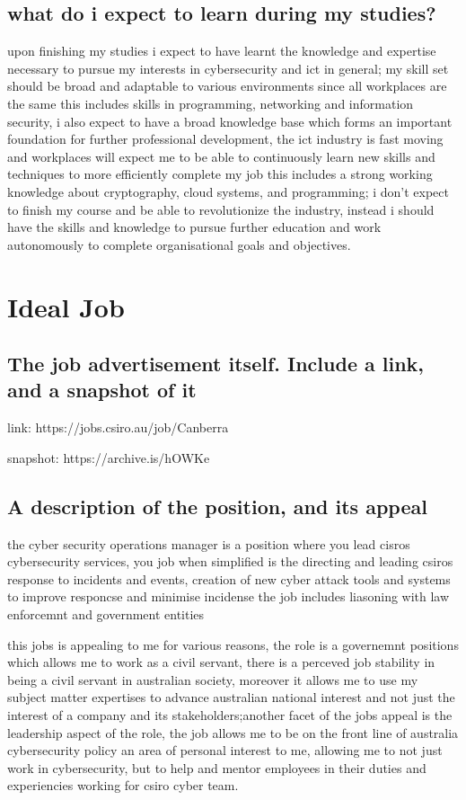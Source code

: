 \documentclass{article}
\begin{document}
\subsection{what do i expect to learn during my studies?}

upon finishing my studies i expect to have learnt the knowledge and expertise necessary to pursue my interests in cybersecurity and ict in general;
my skill set should be broad and adaptable to various environments since all workplaces are the same this includes skills in programming, networking and information security,
i also expect to have a broad knowledge base which forms an important foundation for further professional development, the ict industry is fast moving and workplaces will expect me to be able to
continuously learn new skills and techniques to more efficiently complete my job this includes a strong  working knowledge about cryptography, cloud systems, and programming; 
i don't expect to finish my course and be able to revolutionize the industry, instead i should have the skills and knowledge to pursue further education and work autonomously to complete organisational goals and objectives.

\section{Ideal Job}
\subsection{The job advertisement itself. Include a link, and a snapshot of it}
link: https://jobs.csiro.au/job/Canberra%

\noindent snapshot: https://archive.is/hOWKe

\subsection{A description of the position, and its appeal}

the cyber security operations manager is a position where you lead cisros cybersecurity services, you job when simplified is the directing and leading csiros response to incidents and events, creation of new cyber attack tools and systems to improve responcse and minimise incidense
the job includes liasoning with law enforcemnt and government entities 

this jobs is appealing to me for various reasons, 
the role is a governemnt positions which allows me to work as a civil servant, there is a perceved job stability in being a civil servant in australian society, moreover it allows me to use my subject matter expertises to advance australian national interest and not just the interest of a company and its stakeholders;another facet of the jobs appeal is the leadership aspect of the role, the job allows me to be on the front line of australia cybersecurity policy an area of  personal interest to me, allowing me to not just work in cybersecurity, but to help and mentor employees in their duties and experiencies working for csiro cyber team.
\end{document}

